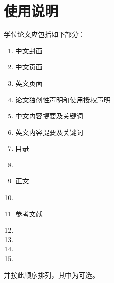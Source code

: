 \documentclass[figurelist,tablelist,algorithmlist,nomlist,masters]{seuthesix}
\begin{document}
\chapter{使用说明}
学位论文应包括如下部分：\\
\begin{enumerate}
\itshape
\item 中文封面
\item 中文页面
\item 英文页面
\item 论文独创性声明和使用授权声明
\item 中文内容提要及关键词
\item 英文内容提要及关键词
\item 目录
\item {}
\item 正文
\item {}
\item 参考文献
\item  {}
\item {}
\item  {}
\item {}
\end{enumerate}
并按此顺序排列，其中为可选。
\end{document}
